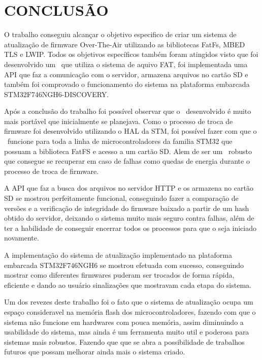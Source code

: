 
\chapter{CONCLUSÃO}
\label{chap:conclusao}
O trabalho conseguiu alcançar o objetivo especifico de criar um sistema de atualização de firmware Over-The-Air utilizando as bibliotecas FatFs, MBED TLS e LWIP. Todos os objetivos específicos também foram atingidos visto que foi desenvolvido um \bootloader\ que utiliza o sistema de aquivo FAT, foi implementada uma API que faz a comunicação com o servidor, armazena arquivos no cartão SD e também foi comprovado o funcionamento do sistema na plataforma embarcada STM32F746NGH6-DISCOVERY.

Após a conclusão do trabalho foi possível observar que o \bootloader\ desenvolvido é muito mais portável que inicialmente se planejava. Como o processo de troca de firmware foi desenvolvido utilizando o HAL da STM, foi possível fazer com que o \bootloader\ funcione para toda a linha de microcontroladores da familia STM32 que possuam a biblioteca FatFS e acesso a um cartão SD. Alem de ser um \bootloader\ robusto que consegue se recuperar em caso de falhas como quedas de energia durante o processo de troca de firmware.

A API que faz a busca dos arquivos no servidor HTTP e os armazena no cartão SD se mostrou perfeitamente funcional, conseguindo fazer a comparação de versões e a verificação de integridade do firmware baixado a partir de um hash obtido do servidor, deixando o sistema muito mais seguro contra falhas, além de ter a habilidade de conseguir encerrar todos os processos para que o \bootloader seja iniciado novamente.


A implementação do sistema de atualização implementado na plataforma embarcada STM32F746NGH6 se mostrou efetuada com sucesso, conseguindo mostrar como diferentes firmwares puderam ser trocados de forma rápida, eficiente e dando ao usuário sinalizações que mostravam cada etapa do sistema.

Um dos revezes deste trabalho foi o fato que o sistema de atualização ocupa um espaço consideravel na memória flash dos microcontroladores, fazendo com que o sistema não funcione em hardwares com pouca memória, assim diminuindo a usabilidade do sistema, mas ainda é um ferramenta muito util e poderosa para sistemas mais robustos. Fazendo que que se abra a possibilidade de trabalhos futuros que possam melhorar ainda mais o sistema criado.
